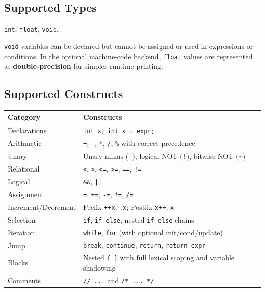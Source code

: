 \documentclass[11pt]{article}
\begin{document}
\subsection{Supported Types}

\texttt{int}, \texttt{float}, \texttt{void}.

\noindent \texttt{void} variables can be declared but cannot be assigned or used in expressions or conditions. In the optional machine-code backend, \texttt{float} values are represented as \textbf{double-precision} for simpler runtime printing.

\subsection{Supported Constructs}

\begin{center}
\renewcommand{\arraystretch}{1.3}
\begin{tabular}{@{}ll@{}}
\toprule
\textbf{Category} & \textbf{Constructs} \\
\midrule
Declarations & \texttt{int x;} \quad \texttt{int x = expr;} \\
Arithmetic & \texttt{+}, \texttt{-}, \texttt{*}, \texttt{/}, \texttt{\%} with correct precedence \\
Unary & Unary minus (\texttt{-}), logical NOT (\texttt{!}), bitwise NOT (\texttt{\textasciitilde}) \\
Relational & \texttt{<}, \texttt{>}, \texttt{<=}, \texttt{>=}, \texttt{==}, \texttt{!=} \\
Logical & \texttt{\&\&}, \texttt{||} \\
Assignment & \texttt{=}, \texttt{+=}, \texttt{-=}, \texttt{*=}, \texttt{/=} \\
Increment/Decrement & Prefix \texttt{++x}, \texttt{--x}; Postfix \texttt{x++}, \texttt{x--} \\
Selection & \texttt{if}, \texttt{if-else}, nested \texttt{if-else} chains \\
Iteration & \texttt{while}, \texttt{for} (with optional init/cond/update) \\
Jump & \texttt{break}, \texttt{continue}, \texttt{return}, \texttt{return expr} \\
Blocks & Nested \texttt{\{ \}} with full lexical scoping and variable shadowing \\
Comments & \texttt{// ...} and \texttt{/* ... */} \\
\bottomrule
\end{tabular}
\end{center}
\end{document}
